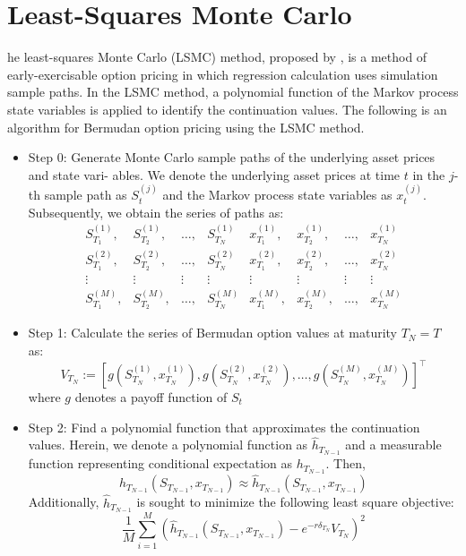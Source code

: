 \documentclass[11pt,a4paper]{article}
\theoremstyle{remark}
\begin{document}
	\section{Least-Squares Monte Carlo}
	he least-squares Monte Carlo (LSMC) method, proposed by \cite{longstaff2001valuing}, is a method of early-exercisable option pricing in which regression calculation uses simulation sample paths. In the LSMC method, a polynomial function of the Markov process state variables is applied to identify the continuation values. The following is an algorithm for Bermudan option pricing using the LSMC method.
	\begin{itemize}
		\item Step 0: Generate Monte Carlo sample paths of the underlying asset prices and state vari-
		ables. We denote the underlying asset prices at time $t$ in the $j$-th sample path as $S^{(j)}_t$ and the Markov process state variables as $x^{(j)}_t$. Subsequently, we obtain the series of paths as:
		\begin{equation*}
			\begin{array}{cccccccc}
				S_{T_1}^{(1)}, & S_{T_2}^{(1)}, & \ldots, & S_{T_N}^{(1)} & x_{T_1}^{(1)}, & x_{T_2}^{(1)}, & \ldots, & x_{T_N}^{(1)} \\
				S_{T_1}^{(2)}, & S_{T_2}^{(2)}, & \ldots, & S_{T_N}^{(2)} & x_{T_1}^{(2)}, & x_{T_2}^{(2)}, & \ldots, & x_{T_N}^{(2)} \\
				\vdots & \vdots & \vdots & \vdots & \vdots & \vdots & \vdots & \vdots \\
				S_{T_1}^{(M)}, & S_{T_2}^{(M)}, & \ldots, & S_{T_N}^{(M)} & x_{T_1}^{(M)}, & x_{T_2}^{(M)}, & \ldots, & x_{T_N}^{(M)}
			\end{array}
		\end{equation*}
		
		\item Step 1: Calculate the series of Bermudan option values at maturity $T_N = T$ as:
		\begin{equation*}
			V_{T_N}:=\left[g\left(S_{T_N}^{(1)}, x_{T_N}^{(1)}\right), g\left(S_{T_N}^{(2)},  x_{T_N}^{(2)}\right), \ldots, g\left(S_{T_N}^{(M)},  x_{T_N}^{(M)}\right)\right]^{\top}
		\end{equation*}
		where $g$ denotes a payoff function of $S_t$
		
		\item Step 2: Find a polynomial function that approximates the continuation values. Herein, we denote a polynomial function as $\hat{h}_{T_{N−1}}$ and a measurable function representing conditional expectation as $h_{T_{N-1}}$.  Then,
		\begin{equation*}
			h_{T_{N-1}}\left(S_{T_{N-1}}, x_{T_{N-1}}\right) \approx \hat{h}_{T_{N-1}}\left(S_{T_{N-1}}, x_{T_{N-1}}\right)
		\end{equation*}
		Additionally, $\hat{h}_{T_{N−1}}$ is sought to minimize the following least square objective:
		\begin{equation*}
			\frac{1}{M} \sum_{i=1}^M\left(\hat{h}_{T_{N-1}}\left(S_{T_{N-1}}, x_{T_{N-1}}\right)-e^{-r \delta_{T_N}} V_{T_N}\right)^2
		\end{equation*}
		

\end{itemize}
\end{document}
